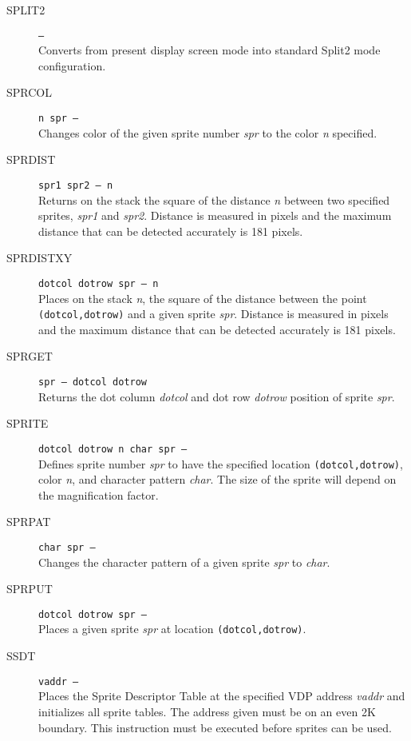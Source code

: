 \documentclass{article}
\begin{document}
\begin{multicols}{2}[]
\begin{description}
			\item[SPLIT2]\texttt{--- }\\
				Converts from present display screen mode into standard Split2 mode
				configuration.

			\item[SPRCOL]\texttt{n spr --- }\\
				Changes color of the given sprite number \textit{spr} to the color
				\textit{n} specified.

			\item[SPRDIST]\texttt{spr1 spr2 --- n }\\
				Returns on the stack the square of the distance \textit{n} between
				two specified sprites, \textit{spr1} and \textit{spr2}. Distance is
				measured in pixels and the maximum distance that can be detected
				accurately is 181 pixels.

			\item[SPRDISTXY]\texttt{dotcol dotrow spr --- n }\\
				Places on the stack \textit{n}, the square of the distance between
				the point \verb|(dotcol,dotrow)| and a given sprite \textit{spr}.
				Distance is measured in pixels and the maximum distance that
				can be detected accurately is 181 pixels.

			\item[SPRGET]\texttt{spr --- dotcol dotrow }\\
				Returns the dot column \textit{dotcol} and dot row \textit{dotrow}
				position of sprite \textit{spr}.

			\item[SPRITE]\texttt{dotcol dotrow n char spr --- }\\
				Defines sprite number \textit{spr} to have the specified location
				\verb|(dotcol,dotrow)|, color \textit{n}, and character pattern
				\textit{char}. The size of the sprite will depend on the magnification
				factor.

			\item[SPRPAT]\texttt{char spr --- }\\
				Changes the character pattern of a given sprite \textit{spr} to
				\textit{char}.

			\item[SPRPUT]\texttt{dotcol dotrow spr --- }\\
				Places a given sprite \textit{spr} at location \verb|(dotcol,dotrow)|.

			\item[SSDT]\texttt{vaddr --- }\\
				Places the Sprite Descriptor Table at the specified VDP address
				\textit{vaddr} and initializes all sprite tables. The address given
				must be on an even 2K boundary. This instruction must be executed
				before sprites can be used.


\end{description}
\end{multicols}
\end{document}
